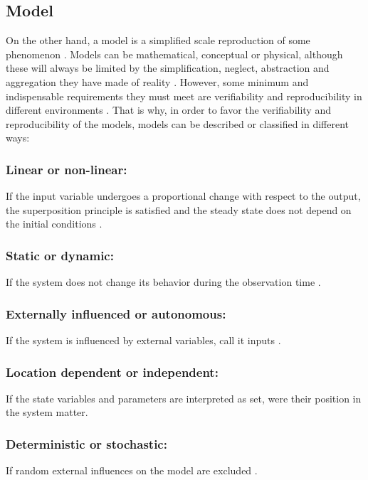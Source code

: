 \documentclass{article}
\begin{document}
\begin{doublespacing}
\subsection{Model} 
{
\par On the other hand, a model is a simplified scale reproduction of some phenomenon \cite{kaestner:basics}. Models can be mathematical, conceptual or physical, although these will always be limited by the simplification, neglect, abstraction and aggregation they have made of reality \cite{kaestner:basics}. However, some minimum and indispensable requirements they must meet are verifiability and reproducibility in different environments \cite{kaestner:basics}. That is why, in order to favor the verifiability and reproducibility of the models, models can be described or classified in different ways:

\subsubsection{Linear or non-linear:}
\par If the input variable undergoes a proportional change with respect to the output, the superposition principle is satisfied and the steady state does not depend on the initial conditions \cite{kaestner:basics}.

\subsubsection{Static or dynamic:}
\par If the system does not change its behavior during the observation time \cite{kaestner:basics}.

\subsubsection{Externally influenced or autonomous:}
\par If the system is influenced by external variables, call it inputs \cite{kaestner:basics}.

\subsubsection{Location dependent or independent:}
\par If the state variables and parameters are interpreted as set, were their position in the system matter\cite{kaestner:basics}. 

\subsubsection{Deterministic or stochastic:}
\par If random external influences on the model are excluded \cite{kaestner:basics}.

}
\end{doublespacing}
\end{document}

